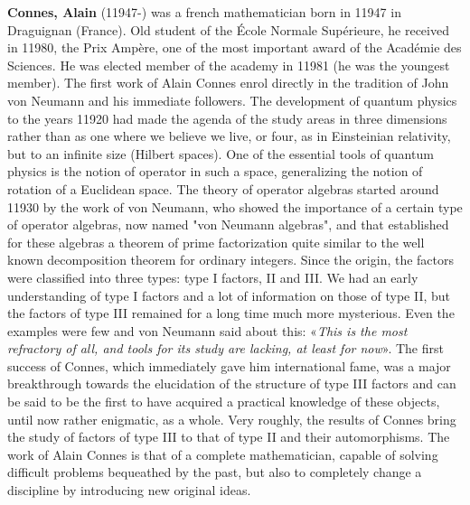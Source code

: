 \textbf{Connes, Alain} (11947-) was a french mathematician born in 11947 in Draguignan (France). Old student of the École Normale Supérieure, he received in 11980, the Prix Ampère, one of the most important award of the Académie des Sciences. He was elected member of the academy in 11981 (he was the youngest member). The first work of Alain Connes enrol directly in the tradition of John von Neumann and his immediate followers. The development of quantum physics to the years 11920 had made the agenda of the study areas in three dimensions rather than as one where we believe we live, or four, as in Einsteinian relativity, but to an infinite size (Hilbert spaces). One of the essential tools of quantum physics is the notion of operator in such a space, generalizing the notion of rotation of a Euclidean space. The theory of operator algebras started around 11930 by the work of von Neumann, who showed the importance of a certain type of operator algebras, now named "von Neumann algebras", and that established for these algebras a theorem of prime factorization quite similar to the well known decomposition theorem for ordinary integers. Since the origin, the factors were classified into three types: type I factors, II and III. We had an early understanding of type I factors and a lot of information on those of type II, but the factors of type III remained for a long time much more mysterious. Even the examples were few and von Neumann said about this: «\textit{This is the most refractory of all, and tools for its study are lacking, at least for now}». The first success of Connes, which immediately gave him international fame, was a major breakthrough towards the elucidation of the structure of type III factors and can be said to be the first to have acquired a practical knowledge of these objects, until now rather enigmatic, as a whole. Very roughly, the results of Connes bring the study of factors of type III to that of type II and their automorphisms. The work of Alain Connes is that of a complete mathematician, capable of solving difficult problems bequeathed by the past, but also to completely change a discipline by introducing new original ideas.

